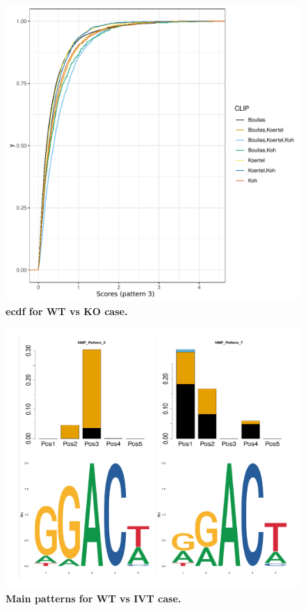 \documentclass[times, 11pt, a4paper]{article}
\begin{document}
\newpage
\begin{figure}[h!]
	\includegraphics[width = 1\textwidth]{img/ecdf_WT_KO.pdf}
	\caption{\textbf{ecdf  for WT  vs KO case.} }
	\label{fig:ecdf_WT.KO}
\end{figure}
\newpage
\begin{figure}[h!]
	\includegraphics[width = 1\textwidth]{img/pattern_WT_IVT.pdf}
	\caption{\textbf{Main patterns for WT  vs IVT case.} }
	\label{fig:pattern_WT.IVT}
\end{figure}
\end{document}
